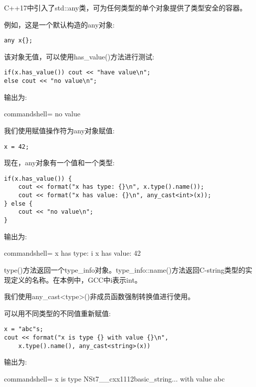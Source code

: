
C++17中引入了std::any类，可为任何类型的单个对象提供了类型安全的容器。

例如，这是一个默认构造的any对象:

\begin{lstlisting}[style=styleCXX]
any x{};
\end{lstlisting}

该对象无值，可以使用has\_value()方法进行测试:

\begin{lstlisting}[style=styleCXX]
if(x.has_value()) cout << "have value\n";
else cout << "no value\n";
\end{lstlisting}

输出为:

\begin{tcblisting}{commandshell={}}
no value
\end{tcblisting}

我们使用赋值操作符为any对象赋值:

\begin{lstlisting}[style=styleCXX]
x = 42;
\end{lstlisting}

现在，any对象有一个值和一个类型:

\begin{lstlisting}[style=styleCXX]
if(x.has_value()) {
	cout << format("x has type: {}\n", x.type().name());
	cout << format("x has value: {}\n", any_cast<int>(x));
} else {
	cout << "no value\n";
}
\end{lstlisting}

输出为:

\begin{tcblisting}{commandshell={}}
x has type: i
x has value: 42
\end{tcblisting}

type()方法返回一个type\_info对象。type\_info::name()方法返回C-string类型的实现定义的名称。在本例中，GCC中i表示int。

我们使用any\_cast<type>()非成员函数强制转换值进行使用。

可以用不同类型的不同值重新赋值:

\begin{lstlisting}[style=styleCXX]
x = "abc"s;
cout << format("x is type {} with value {}\n",
	x.type().name(), any_cast<string>(x))
\end{lstlisting}

输出为:

\begin{tcblisting}{commandshell={}}
x is type NSt7__cxx1112basic_string... with value abc
\end{tcblisting}


